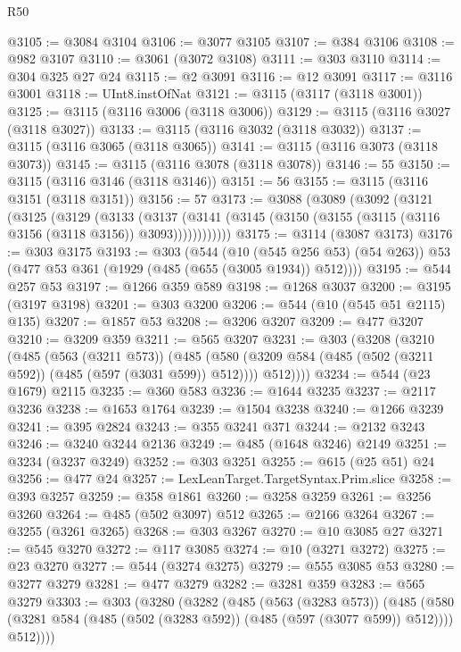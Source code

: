 \begin{lexlean}{R50}
\begin{coremodule}
@3105 := @3084 @3104
@3106 := @3077 @3105
@3107 := @384 @3106
@3108 := @982 @3107
@3110 := @3061 (@3072 @3108)
@3111 := @303 @3110
@3114 := @304 @325 @27 @24
@3115 := @2 @3091
@3116 := @12 @3091
@3117 := @3116 @3001
@3118 := UInt8.instOfNat
@3121 := @3115 (@3117 (@3118 @3001))
@3125 := @3115 (@3116 @3006 (@3118 @3006))
@3129 := @3115 (@3116 @3027 (@3118 @3027))
@3133 := @3115 (@3116 @3032 (@3118 @3032))
@3137 := @3115 (@3116 @3065 (@3118 @3065))
@3141 := @3115 (@3116 @3073 (@3118 @3073))
@3145 := @3115 (@3116 @3078 (@3118 @3078))
@3146 := 55
@3150 := @3115 (@3116 @3146 (@3118 @3146))
@3151 := 56
@3155 := @3115 (@3116 @3151 (@3118 @3151))
@3156 := 57
@3173 := @3088
    (@3089
      (@3092
        (@3121
          (@3125
            (@3129
              (@3133
                (@3137
                  (@3141 (@3145 (@3150 (@3155 (@3115 (@3116 @3156 (@3118 @3156)) @3093))))))))))))
@3175 := @3114 (@3087 @3173)
@3176 := @303 @3175
@3193 := @303
    (@544
      (@10 (@545 @256 @53) (@54 @263))
      @53
      (@477 @53 @361 (@1929 (@485 (@655 (@3005 @1934)) @512))))
@3195 := @544 @257 @53
@3197 := @1266 @359 @589
@3198 := @1268 @3037
@3200 := @3195 (@3197 @3198)
@3201 := @303 @3200
@3206 := @544 (@10 (@545 @51 @2115) @135)
@3207 := @1857 @53
@3208 := @3206 @3207
@3209 := @477 @3207
@3210 := @3209 @359
@3211 := @565 @3207
@3231 := @303
    (@3208
      (@3210
        (@485
          (@563 (@3211 @573))
          (@485
            (@580 (@3209 @584 (@485 (@502 (@3211 @592)) (@485 (@597 (@3031 @599)) @512))))
            @512))))
@3234 := @544 (@23 @1679) @2115
@3235 := @360 @583
@3236 := @1644 @3235
@3237 := @2117 @3236
@3238 := @1653 @1764
@3239 := @1504 @3238
@3240 := @1266 @3239
@3241 := @395 @2824
@3243 := @355 @3241 @371
@3244 := @2132 @3243
@3246 := @3240 @3244 @2136
@3249 := @485 (@1648 @3246) @2149
@3251 := @3234 (@3237 @3249)
@3252 := @303 @3251
@3255 := @615 (@25 @51) @24
@3256 := @477 @24
@3257 := LexLeanTarget.TargetSyntax.Prim.slice
@3258 := @393 @3257
@3259 := @358 @1861
@3260 := @3258 @3259
@3261 := @3256 @3260
@3264 := @485 (@502 @3097) @512
@3265 := @2166 @3264
@3267 := @3255 (@3261 @3265)
@3268 := @303 @3267
@3270 := @10 @3085 @27
@3271 := @545 @3270
@3272 := @117 @3085
@3274 := @10 (@3271 @3272)
@3275 := @23 @3270
@3277 := @544 (@3274 @3275)
@3279 := @555 @3085 @53
@3280 := @3277 @3279
@3281 := @477 @3279
@3282 := @3281 @359
@3283 := @565 @3279
@3303 := @303
    (@3280
      (@3282
        (@485
          (@563 (@3283 @573))
          (@485
            (@580 (@3281 @584 (@485 (@502 (@3283 @592)) (@485 (@597 (@3077 @599)) @512))))
            @512))))

\end{coremodule}
\end{lexlean}
